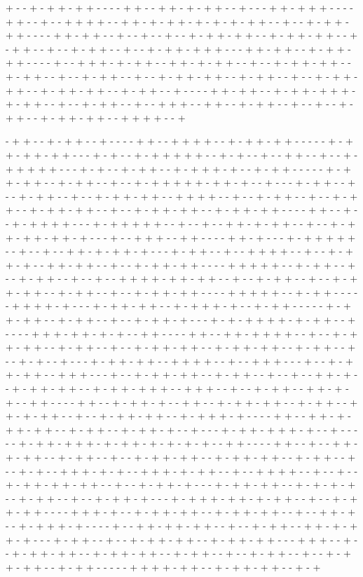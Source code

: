 + - - + - + + - + + - - - - + + - - + + - + - + + - - + - - - + + - + + + - - - - + + - - + - - + + + + - - + + - + - + + - + - + - + - + + - - + - - + - + + - + + - - - - + + - + + - - + - - + - - + - - + - + + - + + - - + - + + - + + - - + - + + - - + - - + - + + - - + - - + - + + - + + + - - - + + - + + - - + - + + - + + - - - - + - - + + + - + - + + - - + + - + - + + - - + - - + - + + - + + - - + - + + - - + - - + - + + - - + - - + - + + - + + - - + - + + - - + - - + - + + - + + - - + - + + - + + - - + - + + - - + - - - - + + - + + - - + - + + - + + + - + - + + - - + - - + - + + - - + - - + + + - - + + - - + - + + - - + - - + - - + - + + - - + - + + - + + - - + + + + - - + 

- + + - - + - + + - - + - - - - + + - - + + + + - - + - + + - + + - - - - - + - + + - + + - + + - - - + - + - - + - + + + + + - - + - + - - + - - + + - - + - - + - + + + + + - - - + - + - - + - + + - - + - + + + - + - - + - + + - - - - - + - + + - + + - - + - + + - - + - - + - + + + + + - + + - + - - + - - - + - + + - - + - - + - + + - - + - - + - + + - + + - - + + + + - - + - - + - + + - - + - - + - + + - - + - + + - + + - - + - - + - + + - + + - - + - + + - + + - - - - + + - - + - - + - + + + + - - - + - + + + + + - - + - - + - - + + - + - + + - - + - - + - + + - + + - + + - + - - - + - - + + + - - + + - - - - + + - + - - - + - + + + + + - - + - - + - - + + - + - + + - + - - - + - + + - - + - - + + + + - - + - - + - + + - + - - + + - + + - - + - - + - + + - + + - - - - + + + + + - - + - + + - - + - - + - + + - - + - - + - - + + + + - + + - + + - - + - - + - + + - - + - - + - + + - + + - - + - + + - - + - - + - + + - + + - - - - + + + + + - - + - + + - - - - - + + + + - + - - - + - + + - + + - - + - + + + - + - - + - + + - - - - - + - + + - + + - - + - + + - - + - - + - + + - + - - - + - + - + + + + - + - + + - - + - - - - + + + - + + - + - + - - + + - - - - + + - - + + - + + + + - - + - - + - + + - + + - - + - + + - - + - - + - + + - + + - - + - + + - + + - - + - + + - - + - - + - + - - + - - - + - + + - + + - - + + + + - - + - - + + + - - - + - - + - + + - + + - - + + + - - - + - - + - + + - + + - - + - + + - - + - - + - - + + - + - - + - + + - + + - - + - + + - + + + - - + + + - - + - - + - + + - - + + - + - + - - + + - - - - + + - - + - + + - + - - + + - - + - + + - + + - - + - + + - - + + - + - + + - - + - - + - + + - + + - - + - + + + - + - - - - + + - - + + - + - + + - + + - - + - + + - - + - + + - + - - + - - - + - + + - + + + - + - - + - - - - - + - + + - + + + - + - + + - + - + - + - + - - + + - - - - + + - - + - - + + - + - + + - - + - + + - - + - - + - + + - + + - - + - + + - + + - - + - + + - - + - - + - + - - + + + - + - + - - + + + - + - + + - - + - - + + + + - - + - - + - - + - + + - + + - + + - - + - - + - + + - + - - - + - + + - + + - - + - + - + - + - - + - + + - - + - - + - + + - + - - - + - + + + - + + - + - + + - - + - - + - + + - + + - - - - + + + - + - - + - + + - + + - - + - + + - + + - - + - - + + - + - - + - + + + - + - - - - + - - + + - + + - + + - - + - - + - + + - - + + - + - + + - + - - - + - + + - - + - - + - + + - + + - - + - + + - + + - - - + + + - - + - - + - + + - + + - - + - + + - + + - - + - + + - - + - - + - + + - - + - - + - + + - + + - - + - + + - - - - - + + + + - + + - - + - + + - + + - - + - + 